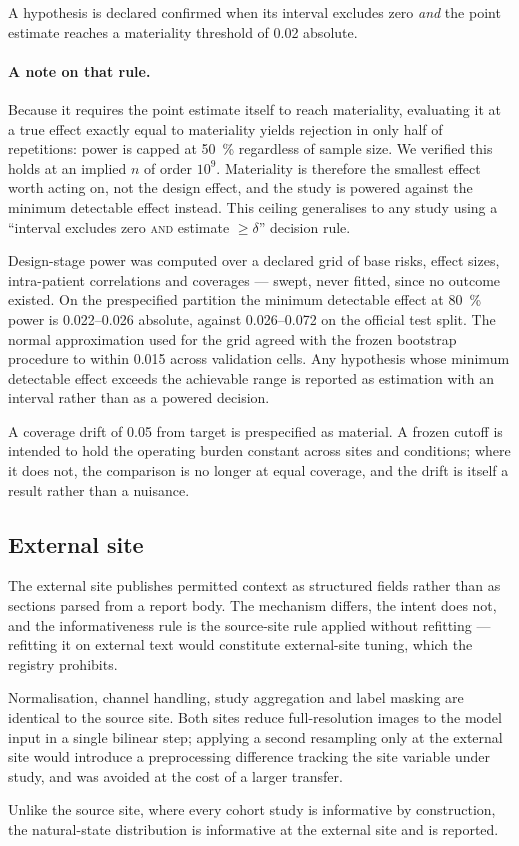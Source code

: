 A hypothesis is declared confirmed when its interval excludes zero \emph{and}
the point estimate reaches a materiality threshold of \num{0.02} absolute.

\paragraph{A note on that rule.} Because it requires the point estimate itself
to reach materiality, evaluating it at a true effect exactly equal to
materiality yields rejection in only half of repetitions: power is capped at
\SI{50}{\percent} regardless of sample size. We verified this holds at an
implied $n$ of order $10^{9}$. Materiality is therefore the smallest effect
worth acting on, not the design effect, and the study is powered against the
minimum detectable effect instead. This ceiling generalises to any study using a
``interval excludes zero \textsc{and} estimate $\geq \delta$'' decision rule.

Design-stage power was computed over a declared grid of base risks, effect
sizes, intra-patient correlations and coverages --- swept, never fitted, since
no outcome existed. On the prespecified partition the minimum detectable effect
at \SI{80}{\percent} power is \numrange{0.022}{0.026} absolute, against
\numrange{0.026}{0.072} on the official test split. The normal approximation
used for the grid agreed with the frozen bootstrap procedure to within
\num{0.015} across validation cells. Any hypothesis whose minimum detectable
effect exceeds the achievable range is reported as estimation with an interval
rather than as a powered decision.

A coverage drift of \num{0.05} from target is prespecified as material. A frozen
cutoff is intended to hold the operating burden constant across sites and
conditions; where it does not, the comparison is no longer at equal coverage,
and the drift is itself a result rather than a nuisance.

\subsection{External site}

The external site publishes permitted context as structured fields rather than
as sections parsed from a report body. The mechanism differs, the intent does
not, and the informativeness rule is the source-site rule applied without
refitting --- refitting it on external text would constitute external-site
tuning, which the registry prohibits.

Normalisation, channel handling, study aggregation and label masking are
identical to the source site. Both sites reduce full-resolution images to the
model input in a single bilinear step; applying a second resampling only at the
external site would introduce a preprocessing difference tracking the site
variable under study, and was avoided at the cost of a larger transfer.

Unlike the source site, where every cohort study is informative by construction,
the natural-state distribution is informative at the external site and is
reported.
